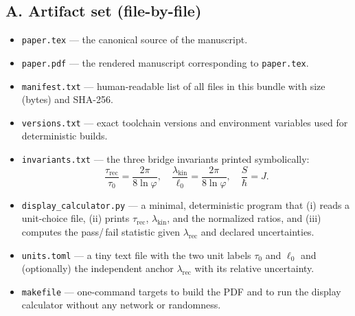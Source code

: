 \documentclass[11pt]{article}
\theoremstyle{plain}
\theoremstyle{definition}
\theoremstyle{remark}
\begin{document}
\subsection*{A. Artifact set (file-by-file)}
\begin{itemize}
  \item \texttt{paper.tex} — the canonical source of the manuscript.
  \item \texttt{paper.pdf} — the rendered manuscript corresponding to \texttt{paper.tex}.
  \item \texttt{manifest.txt} — human-readable list of all files in this bundle with size (bytes) and SHA-256.
  \item \texttt{versions.txt} — exact toolchain versions and environment variables used for deterministic builds.
  \item \texttt{invariants.txt} — the three bridge invariants printed symbolically:
  \[
  \frac{\tau_{\mathrm{rec}}}{\tau_{0}}=\frac{2\pi}{8\ln\varphi},\quad
  \frac{\lambda_{\mathrm{kin}}}{\ell_{0}}=\frac{2\pi}{8\ln\varphi},\quad
  \frac{S}{\hbar}=J.
  \]
  \item \texttt{display\_calculator.py} — a minimal, deterministic program that (i) reads a unit-choice file, (ii) prints \(\tau_{\mathrm{rec}}\), \(\lambda_{\mathrm{kin}}\), and the normalized ratios, and (iii) computes the pass/\,fail statistic given \(\lambda_{\mathrm{rec}}\) and declared uncertainties.
  \item \texttt{units.toml} — a tiny text file with the two unit labels \(\tau_{0}\) and \(\ell_{0}\) and (optionally) the independent anchor \(\lambda_{\mathrm{rec}}\) with its relative uncertainty.
  \item \texttt{makefile} — one-command targets to build the PDF and to run the display calculator without any network or randomness.
\end{itemize}
\end{document}
